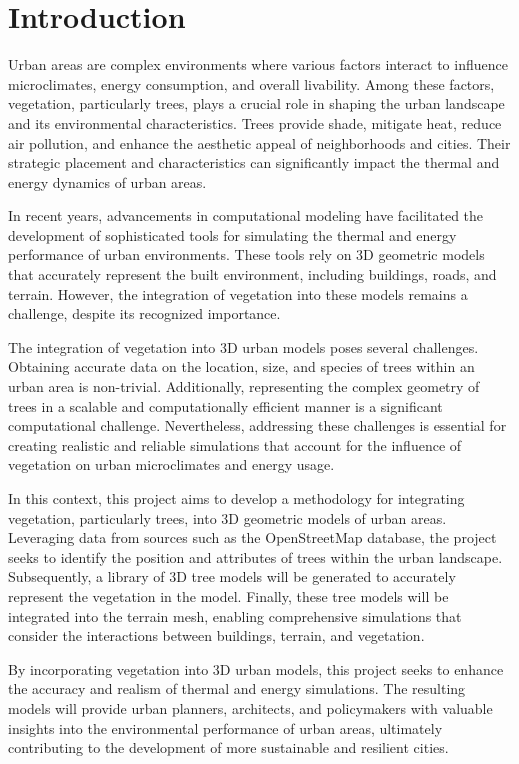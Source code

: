 \documentclass[12pt]{article}
\begin{document}
\section{Introduction}
Urban areas are complex environments where various factors interact to influence 
microclimates, energy consumption, and overall livability. Among these factors, 
vegetation, particularly trees, plays a crucial role in shaping the urban landscape 
and its environmental characteristics. Trees provide shade, mitigate heat, reduce 
air pollution, and enhance the aesthetic appeal of neighborhoods and cities. Their 
strategic placement and characteristics can significantly impact the thermal and 
energy dynamics of urban areas.

In recent years, advancements in computational modeling have facilitated the 
development of sophisticated tools for simulating the thermal and energy performance 
of urban environments. These tools rely on 3D geometric models that accurately 
represent the built environment, including buildings, roads, and terrain. However, 
the integration of vegetation into these models remains a challenge, despite its 
recognized importance.

The integration of vegetation into 3D urban models poses several challenges. 
Obtaining accurate data on the location, size, and species of trees within an 
urban area is non-trivial. Additionally, representing the complex geometry of trees 
in a scalable and computationally efficient manner is a significant computational 
challenge. Nevertheless, addressing these challenges is essential for creating 
realistic and reliable simulations that account for the influence of vegetation on 
urban microclimates and energy usage.

In this context, this project aims to develop a methodology for integrating 
vegetation, particularly trees, into 3D geometric models of urban areas. Leveraging 
data from sources such as the OpenStreetMap database, the project seeks to identify 
the position and attributes of trees within the urban landscape. Subsequently, a 
library of 3D tree models will be generated to accurately represent the vegetation 
in the model. Finally, these tree models will be integrated into the terrain mesh, 
enabling comprehensive simulations that consider the interactions between buildings, 
terrain, and vegetation.

By incorporating vegetation into 3D urban models, this project seeks to enhance the 
accuracy and realism of thermal and energy simulations. The resulting models will 
provide urban planners, architects, and policymakers with valuable insights into 
the environmental performance of urban areas, ultimately contributing to the 
development of more sustainable and resilient cities.
\end{document}
